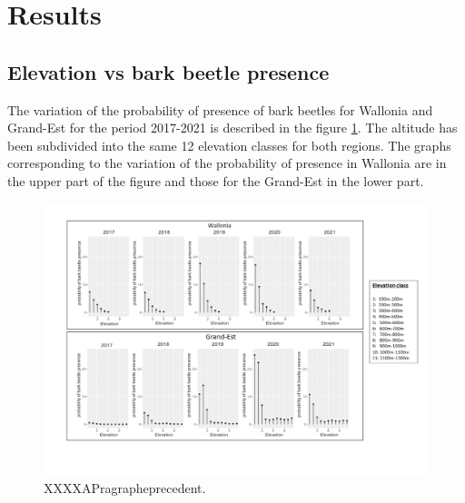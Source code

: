 \documentclass[3p,procedia]{elsarticle}
\begin{document}




	





\section{Results}

\subsection{ Elevation vs bark beetle presence}
The variation of the probability of presence of bark beetles for Wallonia and Grand-Est for the period 2017-2021 is described in the figure 
\ref{alti_sco}.
 The altitude has been subdivided into the same 12 elevation classes for both regions. The graphs corresponding to the variation of the probability of presence in Wallonia are in the upper part of the figure and those for the Grand-Est in the lower part.

\begin{figure}
\centering
	\includegraphics[width=\textwidth]{graphe_wall_GDE.png}
     \caption{XXXXAPragrapheprecedent.}
	\label{alti_sco}
\end{figure}
\end{document}
